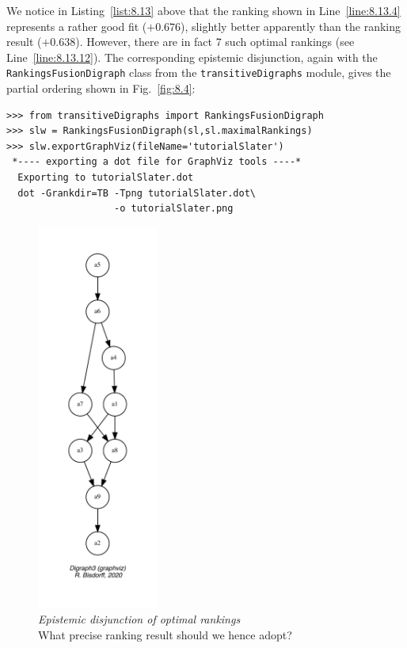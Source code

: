 We notice in Listing~\ref{list:8.13} above that the \Slater ranking shown in Line~\ref{line:8.13.4} represents a rather good fit ($+0.676$), slightly better apparently than the \NetFlows ranking result ($+0.638$). However, there are in fact 7 such optimal \Slater rankings (see Line~\ref{line:8.13.12}). The corresponding epistemic disjunction, again with the \texttt{RankingsFusionDigraph} class from the \texttt{transitiveDigraphs} module, gives the partial ordering shown in Fig.~\vref{fig:8.4}:
\begin{lstlisting}[caption={Computing the epistemic disjunction of optimal \Slater rankings},label=list:8.14]
>>> from transitiveDigraphs import RankingsFusionDigraph
>>> slw = RankingsFusionDigraph(sl,sl.maximalRankings)
>>> slw.exportGraphViz(fileName='tutorialSlater')
 *---- exporting a dot file for GraphViz tools ----*
  Exporting to tutorialSlater.dot
  dot -Grankdir=TB -Tpng tutorialSlater.dot\
                   -o tutorialSlater.png
\end{lstlisting}
\begin{figure}[ht]
\sidecaption[t]
\includegraphics[width=4cm]{Figures/8-4-tutorialSlater.pdf}
\caption[Epistemic disjunction of optimal \Slater rankings]{\emph{Epistemic disjunction of optimal \Slater rankings}\\ What precise \Slater ranking result should we hence adopt?}
\label{fig:8.4}       %
\end{figure}
       
